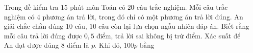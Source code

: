 \begin{ex}%
	Trong đề kiểm tra $15$ phút môn Toán có $20$ câu trắc nghiệm. Mỗi câu trắc nghiệm có $4$ phương án trả lời, trong đó chỉ có một phương án trả lời đúng. An giải chắc chắn đúng $10$ câu, $10$ câu còn lại lựa chọn ngẫu nhiên đáp án. Biết rằng mỗi câu trả lời đúng được $0{,}5$ điểm, trả lời sai không bị trừ điểm. Xác suất để An đạt được đúng $8$ điểm là $p$. Khi đó, $100p$ bằng
\end{ex}
